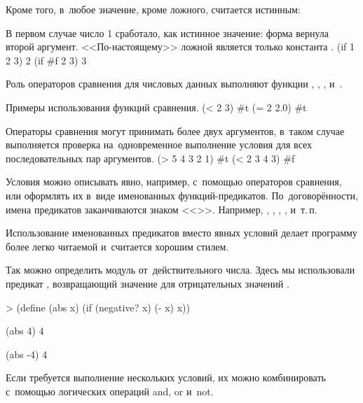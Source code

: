 Кроме того, в~\Scheme любое значение, кроме ложного, считается истинным:

\begin{example}{%
В первом случае число 1 сработало, как истинное значение: форма  вернула второй аргумент. <<По-настоящему>> ложной является только константа .}
\REPL
  {(if 1 2 3)}
  {2}
\REPL
  {(if \#f 2 3)}
  {3}
\end{example}


Роль операторов сравнения для числовых данных выполняют функции \s{=}, \s{<}, \s{>}, \s{<=} и~\s{>=}.

\begin{example}{%
Примеры использования функций сравнения.}
\REPL
  {(< 2 3)}
  {\#t}
\REPL
  {(= 2 2.0)}
  {\#t}
\end{example}

\vspace{-\medskipamount}
\begin{example}{%
Операторы сравнения могут принимать более двух аргументов, в~таком случае выполняется проверка на~одновременное выполнение условия для всех последовательных пар аргументов.}
\REPL
  {(> 5 4 3 2 1)}
  {\#t}
\REPL
  {(< 2 3 4 3)}
  {\#f}
\end{example}

Условия можно описывать явно, например, с~помощью операторов сравнения, или оформлять их в~виде именованных функций-предикатов. По~договорённости, имена предикатов заканчиваются знаком <<>>. Например, , , , ,  и~т.\,п.

Использование именованных предикатов вместо явных условий делает программу более легко читаемой и~считается хорошим стилем.

\begin{example}{Так можно определить модуль от~действительного числа. Здесь мы использовали предикат , возвращающий значение  для отрицательных значений .}
\begin{ExampleCode}[emph=x]
> (define (abs x)
    (if (negative? x) 
        (- x) x))
\end{ExampleCode}

\REPL
  {(abs 4)}
  {4}

\REPL
  {(abs -4)}
  {4}
\end{example}

Если требуется выполнение нескольких условий, их можно комбинировать с~помощью логических операций \si{and}, \si{or} и~\si{not}.


